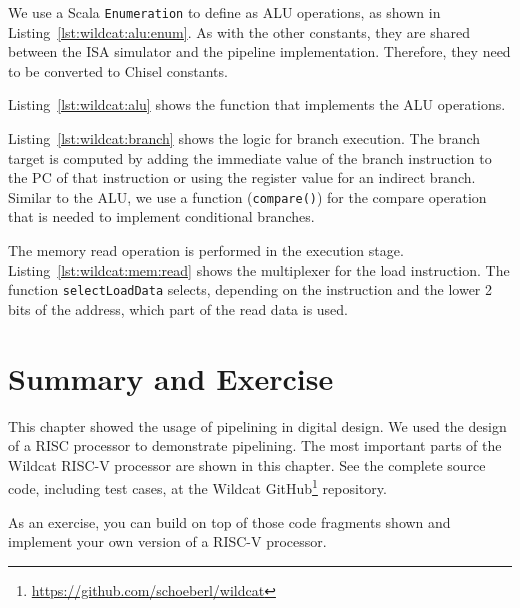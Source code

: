 \documentclass[%
    10pt,
    headinclude, footinclude=false,
    openright, %
    notitlepage,
    cleardoublepage=empty,
    headsepline,
    numbers=noenddot,
    bibliography=totoc, index=totoc,
    ]{scrbook}
\newcommand{\code}[1]{{\lstinline[basicstyle=\small\ttfamily]{#1}}}
\newcommand{\myref}[2]{\href{#1}{#2}}
\renewcommand{\myref}[2]{{#2}{\footnote{\url{#1}}}}
\begin{document}

We use a Scala \code{Enumeration} to define as ALU operations, as shown
in Listing~\ref{lst:wildcat:alu:enum}. As with the other constants, they are shared between the
ISA simulator and the pipeline implementation. Therefore, they need to be converted
to Chisel constants.

Listing~\ref{lst:wildcat:alu} shows the function that implements the ALU operations.



Listing~\ref{lst:wildcat:branch} shows the logic for branch execution.
The branch target is computed by adding the immediate value of the branch instruction
to the PC of that instruction or using the register value for an indirect branch.
Similar to the ALU, we use a function (\code{compare()}) for the compare operation
that is needed to implement conditional branches.




The memory read operation is performed in the execution stage.
Listing~\ref{lst:wildcat:mem:read} shows the multiplexer for the load instruction.
The function \code{selectLoadData} selects, depending on the instruction and
the lower 2 bits of the address, which part of the read data is used. 




\section{Summary and Exercise}

This chapter showed the usage of pipelining in digital design. We used the
design of a RISC processor to demonstrate pipelining. The most important
parts of the Wildcat RISC-V processor are shown in this chapter.
See the complete source code, including test cases, at the
\myref{https://github.com/schoeberl/wildcat}{Wildcat GitHub} repository.

As an exercise, you can build on top of those code fragments shown and implement
your own version of a RISC-V processor. 
\end{document}
